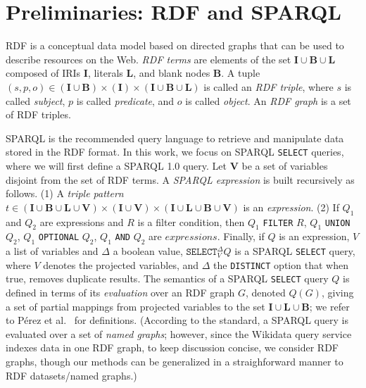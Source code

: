 \documentclass[runningheads]{llncs}
\newcommand{\Iris}{\ensuremath{\mathbf{I}}}
\newcommand{\Lits}{\ensuremath{\mathbf{L}}}
\newcommand{\Bnodes}{\ensuremath{\mathbf{B}}}
\newcommand{\Vars}{\ensuremath{\mathbf{V}}}
\begin{document}
%
\section{Preliminaries: RDF and SPARQL}
\label{sec:preliminar}

RDF is a conceptual data model based on directed graphs that can be used to describe resources on the Web. \emph{RDF terms} are elements of the set $\Iris \cup \Bnodes \cup \Lits$ composed of IRIs $\Iris$, literals $\Lits$, and blank nodes $\Bnodes$. A tuple $ (s, p, o) \in (\Iris \cup  \Bnodes)  \times (\Iris)  \times  (\Iris \cup \Bnodes \cup  \Lits)$  is called an \emph{RDF triple}, where $s$ is called \emph{subject}, $p$ is called \emph{predicate}, and $o$ is called \emph{object}. An \emph{RDF graph} is a set of RDF triples.

SPARQL is the recommended query language to retrieve and manipulate data stored in the RDF format. In this work, we focus on SPARQL \texttt{SELECT} queries, where we will first define a SPARQL 1.0 query. Let $\Vars$ be a set of variables disjoint from the set of RDF terms. A \emph{SPARQL expression} is built recursively as follows. (1) A \emph{triple pattern} $t \in  (\Iris \cup \Bnodes \cup \Lits \cup \Vars) \times (\Iris \cup \Vars) \times (\Iris \cup \Lits \cup \Bnodes \cup \Vars)$ is an \emph{expression}. (2) If $Q_1$ and $Q_2$ are expressions and $R$ is a filter condition, then $Q_1$ \texttt{FILTER} $R$, $Q_1$ \texttt{UNION} $Q_2$, $Q_1$ \texttt{OPTIONAL} $Q_2$, $Q_1$ \texttt{AND} $Q_2$ are $expressions$. Finally, if $Q$ is an expression, $V$ a list of variables and $\Delta$ a boolean value, $\texttt{SELECT}_V^\Delta Q$ is a SPARQL \texttt{SELECT} query, where $V$ denotes the projected variables, and $\Delta$ the \texttt{DISTINCT} option that when true, removes duplicate results. The semantics of a SPARQL \texttt{SELECT} query $Q$ is defined in terms of its \emph{evaluation} over an RDF graph $G$, denoted $Q(G)$, giving a set of partial mappings from projected variables to the set $\Iris \cup \Lits \cup \Bnodes$; we refer to P{\'{e}}rez et al.~\cite{PerezAG09} for definitions. (According to the standard, a SPARQL query is evaluated over a set of \emph{named graphs}; however, since the Wikidata query service indexes data in one RDF graph, to keep discussion concise, we consider RDF graphs, though our methods can be generalized in a straighforward manner to RDF datasets/named graphs.)
\end{document}

